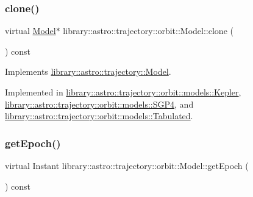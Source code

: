 \mbox{\label{classlibrary_1_1astro_1_1trajectory_1_1orbit_1_1_model_a45d75e4d212a9bb01aa596eaeeae43ae}} 
\subsubsection{\texorpdfstring{clone()}{clone()}}
{\footnotesize\ttfamily virtual \hyperlink{classlibrary_1_1astro_1_1trajectory_1_1orbit_1_1_model}{Model}$\ast$ library\+::astro\+::trajectory\+::orbit\+::\+Model\+::clone (\begin{DoxyParamCaption}{ }\end{DoxyParamCaption}) const\hspace{0.3cm}{\ttfamily [pure virtual]}}



Implements \hyperlink{classlibrary_1_1astro_1_1trajectory_1_1_model_ad6181e14aea57534897e7446a2a27578}{library\+::astro\+::trajectory\+::\+Model}.



Implemented in \hyperlink{classlibrary_1_1astro_1_1trajectory_1_1orbit_1_1models_1_1_kepler_ac78a023cde4a61c62309051c9147d66e}{library\+::astro\+::trajectory\+::orbit\+::models\+::\+Kepler}, \hyperlink{classlibrary_1_1astro_1_1trajectory_1_1orbit_1_1models_1_1_s_g_p4_afa3add6c6855ac1da5632b17986dca02}{library\+::astro\+::trajectory\+::orbit\+::models\+::\+S\+G\+P4}, and \hyperlink{classlibrary_1_1astro_1_1trajectory_1_1orbit_1_1models_1_1_tabulated_a8ccec23a49086c6c3fbda2cc81e7a4dc}{library\+::astro\+::trajectory\+::orbit\+::models\+::\+Tabulated}.

\mbox{\label{classlibrary_1_1astro_1_1trajectory_1_1orbit_1_1_model_acdec7ed6eed001c2ab4ac5442699a316}} 
\subsubsection{\texorpdfstring{get\+Epoch()}{getEpoch()}}
{\footnotesize\ttfamily virtual Instant library\+::astro\+::trajectory\+::orbit\+::\+Model\+::get\+Epoch (\begin{DoxyParamCaption}{ }\end{DoxyParamCaption}) const\hspace{0.3cm}{\ttfamily [pure virtual]}}



